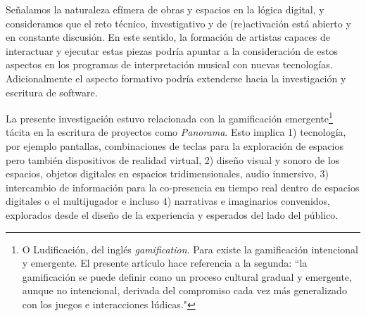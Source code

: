 Señalamos la naturaleza efímera de obras y espacios en la lógica digital, y consideramos que el reto técnico, investigativo y de (re)activación está abierto y en constante discusión. En este sentido, la formación de artistas capaces de interactuar y ejecutar estas piezas podría apuntar a la consideración de estos aspectos en los programas de interpretación musical con nuevas tecnologías. Adicionalmente el aspecto formativo podría extenderse hacia la investigación y escritura de software.  %



La presente investigación estuvo relacionada con la gamificación emergente\footnote{O Ludificación, del inglés \textit{gamification}. Para \cite{gamificacion} existe la gamificación intencional y emergente. El presente artículo hace referencia a la segunda: ``la gamificación se puede definir como un proceso cultural gradual y emergente, aunque no intencional, derivada del compromiso cada vez más generalizado con los juegos e interacciones lúdicas."} tácita en la escritura de proyectos como \textit{Panorama}. Esto implica 1) tecnología, por ejemplo pantallas, combinaciones de teclas para la exploración de espacios pero también dispositivos de realidad virtual, 2) diseño visual y sonoro de los espacios, objetos digitales en espacios tridimensionales, audio inmersivo, 3) intercambio de información para la co-presencia en tiempo real dentro de espacios digitales o el multijugador e incluso 4) narrativas e imaginarios convenidos, explorados desde el diseño de la experiencia y esperados del lado del público. 



